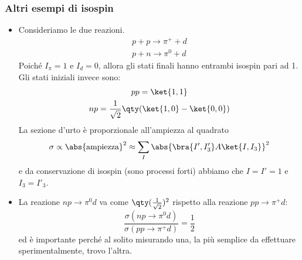 \subsubsection{Altri esempi di isospin}
\begin{itemize}
\item Consideriamo le due reazioni.
\begin{gather*}
p+p\to\pi^++d\\
p+n\to\pi^0+d
\end{gather*}
Poiché $I_\pi=1$ e $I_d=0$, allora gli stati finali hanno entrambi isospin pari ad 1. Gli stati iniziali invece sono:
\begin{gather*}
pp=\ket{1,1}\\
np=\frac1{\sqrt 2}\qty(\ket{1,0}-\ket{0,0})
\end{gather*}
La sezione d'urto è proporzionale all'ampiezza al quadrato
\begin{equation*}
\sigma\propto\abs{\text{ampiezza}}^2 \approx \sum_I \abs{\bra{I',I'_3}A\ket{I,I_3}}^2
\end{equation*}
e da conservazione di isospin (sono processi forti) abbiamo che $I=I'=1$ e $I_3=I'_3$. 
\item La reazione $np\to\pi^0d$ va come $\qty(\frac1{\sqrt2})^2$ rispetto alla reazione $pp\to\pi^+d$:
\begin{equation*}
\frac{\sigma(np\to\pi^0d)}{\sigma(pp\to\pi^+d)}=\frac12
\end{equation*}
ed è importante perché al solito misurando una, la più semplice da effettuare sperimentalmente, trovo l'altra.
\end{itemize}
